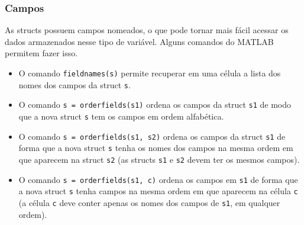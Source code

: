 \documentclass{beamer}
\newcommand{\code}[1]{{\texttt{#1}}}
\newcommand{\acode}[1]{\alert{\texttt{#1}}}
\newcommand{\codigo}[1]{\begin{center}\rm{\code{
  \begin{tabular}{r l}
  #1
  \end{tabular}
  }}\end{center}}
\newcommand{\ac}{\alert{\texttt{>>}}}
\begin{document}
\begin{frame}
   \frametitle{Campos}
   As structs possuem campos nomeados, o que pode tornar mais fácil acessar os dados armazenados nesse tipo de variável. Alguns comandos do MATLAB permitem fazer isso.

   \begin{itemize}
      \item<1-> O comando \code{\acode{fieldnames}(s)} permite recuperar em uma célula a lista dos nomes dos campos da struct \code{s}.
      \item<2-> O comando \code{s = \acode{orderfields}(s1)} ordena os campos da struct \code{s1} de modo que a nova struct \code{s} tem os campos em ordem alfabética.
      \item<3-> O comando \code{s = \acode{orderfields}(s1, s2)} ordena os campos da struct \code{s1} de forma que a nova struct \code{s} tenha os nomes dos campos na mesma ordem em que aparecem na struct \code{s2} (as structs \code{s1} e \code{s2} devem ter os mesmos campos).
      \item<4-> O comando \code{s = \acode{orderfields}(s1, c)} ordena os campos em \code{s1} de forma que a nova struct \code{s} tenha campos na mesma ordem em que aparecem na célula \code{c} (a célula \code{c} deve conter apenas os nomes dos campos de \code{s1}, em qualquer ordem).
   \end{itemize}
\end{frame}
\end{document}
